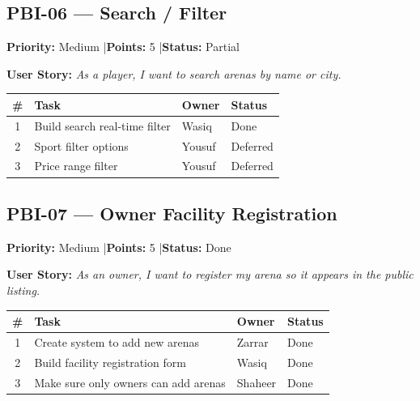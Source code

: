 \documentclass[12pt,a4paper]{article}
\begin{document}
\vspace{1.5em}

\subsection*{PBI-06 --- Search / Filter}
\textbf{Priority:} Medium \quad|\quad \textbf{Points:} 5 \quad|\quad \textbf{Status:} Partial

\vspace{0.3em}
\textbf{User Story:} \textit{As a player, I want to search arenas by name or city.}

\vspace{0.5em}
\noindent\renewcommand{\arraystretch}{1.3}
\begin{tabularx}{\textwidth}{|c|X|l|l|}
\hline
\rowcolor{headerbg}\color{white}\bfseries \# & \color{white}\bfseries Task & \color{white}\bfseries Owner & \color{white}\bfseries Status \\ \hline
1 & Build search real-time filter & Wasiq & Done \\ \hline
\rowcolor{rowgray} 2 & Sport filter options & Yousuf & Deferred \\ \hline
3 & Price range filter & Yousuf & Deferred \\ \hline
\end{tabularx}

\vspace{1.5em}

\subsection*{PBI-07 --- Owner Facility Registration}
\textbf{Priority:} Medium \quad|\quad \textbf{Points:} 5 \quad|\quad \textbf{Status:} Done

\vspace{0.3em}
\textbf{User Story:} \textit{As an owner, I want to register my arena so it appears in the public listing.}

\vspace{0.5em}
\noindent\renewcommand{\arraystretch}{1.3}
\begin{tabularx}{\textwidth}{|c|X|l|l|}
\hline
\rowcolor{headerbg}\color{white}\bfseries \# & \color{white}\bfseries Task & \color{white}\bfseries Owner & \color{white}\bfseries Status \\ \hline
1 & Create system to add new arenas & Zarrar & Done \\ \hline
\rowcolor{rowgray} 2 & Build facility registration form & Wasiq & Done \\ \hline
3 & Make sure only owners can add arenas & Shaheer & Done \\ \hline
\end{tabularx}
\end{document}
